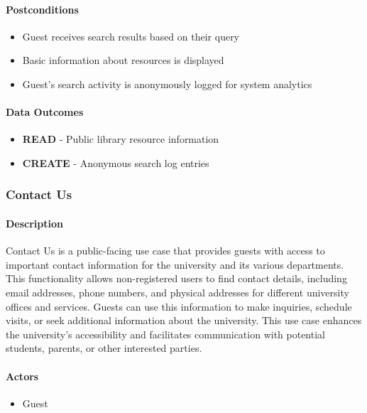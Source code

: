 \paragraph{Postconditions}
\begin{itemize}
    \item Guest receives search results based on their query
    \item Basic information about resources is displayed
    \item Guest's search activity is anonymously logged for system analytics
\end{itemize}

\paragraph{Data Outcomes}
\begin{itemize}
    \item \textbf{READ} - Public library resource information
    \item \textbf{CREATE} - Anonymous search log entries
\end{itemize}

\subsubsection{Contact Us}

\paragraph{Description}
Contact Us is a public-facing use case that provides guests with access to important contact information for the university and its various departments. This functionality allows non-registered users to find contact details, including email addresses, phone numbers, and physical addresses for different university offices and services. Guests can use this information to make inquiries, schedule visits, or seek additional information about the university. This use case enhances the university's accessibility and facilitates communication with potential students, parents, or other interested parties.

\paragraph{Actors}
\begin{itemize}
    \item Guest
\end{itemize}

